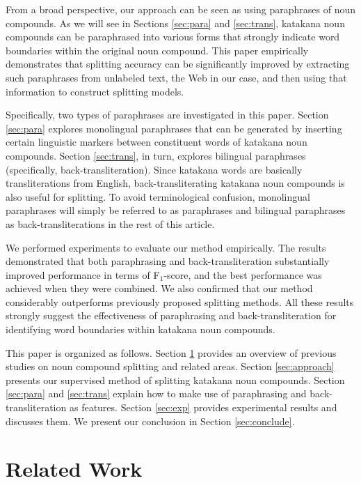 \documentclass[english]{jnlp_1.4_rep}
\begin{document}
From a broad perspective, our approach can be seen as using
paraphrases of noun compounds. As we will see in Sections
\ref{sec:para} and \ref{sec:trans}, katakana noun compounds can be
paraphrased into various forms that strongly indicate word boundaries
within the original noun compound. This paper empirically demonstrates
that splitting accuracy can be significantly improved by extracting
such paraphrases from unlabeled text, the Web in our case, and then
using that information to construct splitting models.

Specifically, two types of paraphrases are investigated in this
paper. Section \ref{sec:para} explores monolingual paraphrases that can
be generated by inserting certain linguistic markers between constituent
words of katakana noun compounds. Section \ref{sec:trans}, in turn,
explores bilingual paraphrases (specifically,
back-transliteration). Since katakana words are basically
transliterations from 
\mbox{English,} back-transliterating katakana noun
compounds is also useful for splitting. To avoid terminological
confusion, monolingual paraphrases will simply be referred to as
paraphrases and bilingual paraphrases as back-transliterations
in the rest of this article.

We performed experiments to evaluate our method empirically. The results
demonstrated that both paraphrasing and back-transliteration
substantially improved performance in terms of F$_{1}$-score, and
the best performance was achieved when they were combined. We also
confirmed that our method considerably outperforms previously proposed
splitting methods. All these results strongly suggest the effectiveness
of paraphrasing and back-transliteration for identifying word boundaries
within katakana noun compounds.

This paper is organized as follows. Section \ref{sec:prev} provides an
overview of previous studies on noun compound splitting and related
areas. Section \ref{sec:approach} presents our supervised method of
splitting katakana noun compounds. Section \ref{sec:para} and
\ref{sec:trans} explain how to make use of paraphrasing and
back-transliteration as features. Section \ref{sec:exp} provides
experimental results and discusses them. We present our conclusion in
Section \ref{sec:conclude}.

\section{Related Work}
\label{sec:prev}
\end{document}
